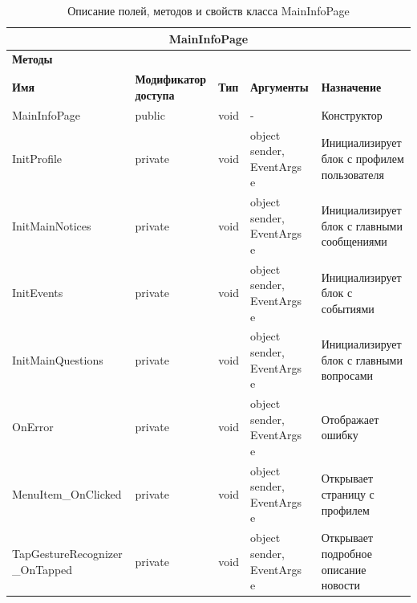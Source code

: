 \documentclass{../includes/TechDoc}
\begin{document}
    \begin{table}[ht]
        \caption{\label{tab:class-maininfopage-table}Описание полей, методов и свойств класса MainInfoPage}
        \centering
        \begin{tabular}{|p{4cm}|p{3cm}|l|p{3cm}|p{5cm}|}
            \hline
            \multicolumn{5}{|c|}{MainInfoPage} \\ \hline
            \multicolumn{5}{|l|}{\textbf{Методы}} \\ \hline
            \textbf{Имя} & \textbf{Модификатор доступа} & \textbf{Тип} & \textbf{Аргументы} & \textbf{Назначение} \\ \hline
            MainInfoPage & public & void & - & Конструктор \\ \hline
            InitProfile & private & void & object sender, EventArgs e & Инициализирует блок с профилем пользователя \\ \hline
            InitMainNotices & private & void & object sender, EventArgs e & Инициализирует блок с главными сообщениями \\ \hline
            InitEvents & private & void & object sender, EventArgs e & Инициализирует блок с событиями \\ \hline
            InitMainQuestions & private & void & object sender, EventArgs e & Инициализирует блок с главными вопросами \\ \hline
            OnError & private & void & object sender, EventArgs e & Отображает ошибку \\ \hline
            MenuItem\_OnClicked & private & void & object sender, EventArgs e & Открывает страницу с профилем \\ \hline
            TapGestureRecognizer \_OnTapped & private & void & object sender, EventArgs e & Открывает подробное описание новости \\ \hline
        \end{tabular}
    \end{table}
\end{document}
